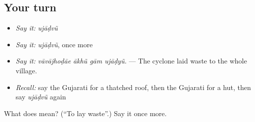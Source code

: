 \subsection*{Your turn}
\begin{itemize}
\raggedright
  \item \emph{Say it:} \emph{ujāḍvũ}
  \item \emph{Say it:} \emph{ujāḍvũ}, once more
  \item \emph{Say it:} \emph{vāvājhoḍāe ākhũ gām ujāḍyũ.} — The cyclone laid waste to the whole village.
  \item \emph{Recall:} say the Gujarati for a thatched roof, then the Gujarati for a hut, then say \emph{ujāḍvũ} again
\end{itemize}

\begin{tcolorbox}[breakable,colback=teal!4,colframe=teal!35!black,title={Before you move on}]
What does  mean? (\textquotedblleft{}To lay waste\textquotedblright{}.) Say it once more.
\end{tcolorbox}
